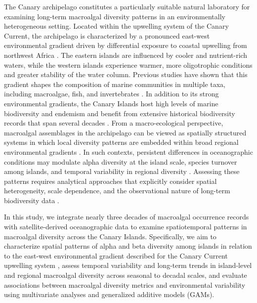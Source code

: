 \documentclass[a4paper,fleqn]{cas-sc}
\begin{document}
The Canary archipelago constitutes a particularly suitable natural laboratory for examining long-term macroalgal diversity patterns in an environmentally heterogeneous setting. Located within the upwelling system of the Canary Current, the archipelago is characterized by a pronounced east-west environmental gradient driven by differential exposure to coastal upwelling from northwest Africa \citep{Barton1998, Aristegui2009, Barton2016}. The eastern islands are influenced by cooler and nutrient-rich waters, while the western islands experience warmer, more oligotrophic conditions and greater stability of the water column. Previous studies have shown that this gradient shapes the composition of marine communities in multiple taxa, including macroalgae, fish, and invertebrates \citep{Barton1998, SANGIL2012, Valdazoetal2017}. In addition to its strong environmental gradients, the Canary Islands host high levels of marine biodiversity and endemism and benefit from extensive historical biodiversity records that span several decades \citep{RIERA2015}. From a macro-ecological perspective, macroalgal assemblages in the archipelago can be viewed as spatially structured systems in which local diversity patterns are embedded within broad regional environmental gradients \citep{Duffy2019Toward}. In such contexts, persistent differences in oceanographic conditions may modulate alpha diversity at the island scale, species turnover among islands, and temporal variability in regional diversity \citep{RILOV2020105045}. Assessing these patterns requires analytical approaches that explicitly consider spatial heterogeneity, scale dependence, and the observational nature of long-term biodiversity data \citep{Medrano2019Long-term}.

In this study, we integrate nearly three decades of macroalgal occurrence records with satellite-derived oceanographic data to examine spatiotemporal patterns in macroalgal diversity across the Canary Islands. Specifically, we aim to characterize spatial patterns of alpha and beta diversity among islands in relation to the east-west environmental gradient described for the Canary Current upwelling system \citep{Barton1998, Aristegui2009, Barton2016}, assess temporal variability and long-term trends in island-level and regional macroalgal diversity across seasonal to decadal scales, and evaluate associations between macroalgal diversity metrics and environmental variability using multivariate analyses and generalized additive models (GAMs).
\end{document}
